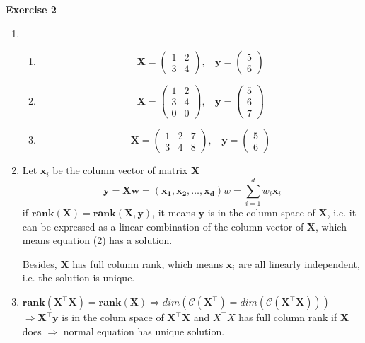 \documentclass[11pt,letter,notitlepage]{article}
\newcommand{\rank}[1]{ \textbf{rank}  (#1)  }
\begin{document}
\begin{solution}
	\textbf{Exercise 2}
	\begin{enumerate}
	 \item 
	 \begin{enumerate}
		\item 
		\[\mathbf{X}=\begin{pmatrix}
						1&2\\3&4
					\end{pmatrix},~~~~
		\mathbf{y}=\begin{pmatrix}
					5\\6
				\end{pmatrix}\]
	
		\item
		\[\mathbf{X}=\begin{pmatrix}
						1&2\\3&4\\0&0
					\end{pmatrix},~~~~
		\mathbf{y}=\begin{pmatrix}
					5\\6\\7
				\end{pmatrix}\]
				
		\item
		\[\mathbf{X}=\begin{pmatrix}
						1&2&7\\3&4&8
					\end{pmatrix},~~~~
		\mathbf{y}=\begin{pmatrix}
					5\\6
				\end{pmatrix}\]
	 \end{enumerate}
	
	 \item
	 Let $\mathbf{x}_i$ be the column vector of matrix $\mathbf{X}$
	 \[\mathbf{y=Xw=(x_1,x_2,\dots, x_d)}w=\sum_{i=1}^d{w_i \mathbf{x}_i}\]
	 if $\rank{\mathbf{X}}=\rank{\mathbf{X,y}}$, it means $\mathbf{y}$ is in the column space of $\mathbf{X}$, i.e. it can be expressed as a linear combination of the column vector of $\mathbf{X}$, which means equation (2) has a solution.
	 
	 Besides, $\mathbf{X}$ has full column rank, which means $\mathbf{x}_i$ are all linearly independent, i.e. the solution is unique.
	 
	 \item
	 $\rank{\mathbf{X^{\top}X}}=\rank{\mathbf{X}}\Rightarrow dim(\mathcal{C}(\mathbf{X^{\top}})=dim(\mathcal{C}(\mathbf{X^{\top}X})))$\\
	 $\Rightarrow \mathbf{X^{\top}y} $ is in the colum space of $\mathbf{X^{\top}X}$ and  $X^{\top}X$ has full column rank if $\mathbf{X}$ does $\Rightarrow$ normal equation has unique solution.
	\end{enumerate}

\end{solution}
\end{document}
